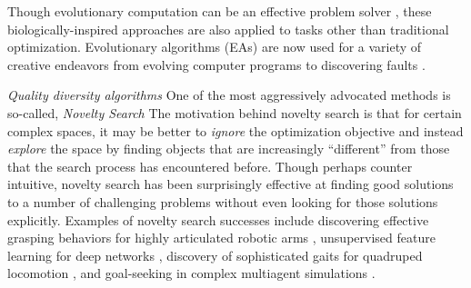 \documentclass[twoside]{article}
\begin{document}
Though evolutionary computation can be an effective problem solver \citep{ec:DeJong2006}, 
these biologically-inspired approaches are also applied to tasks other than traditional optimization.  Evolutionary algorithms (EAs) are now used for a variety of creative endeavors from evolving computer programs \citep{ec:LangdonPoli2002,ec:Koza1992} 
 to discovering faults \citep{HanesWiegand2019tor,Mourad2000srds}.%

\emph{Quality diversity algorithms}  One of the most aggressively advocated methods is so-called, \emph{Novelty Search} \citep{StanleyLehman2015,Lehman2013gecco,LehmanStanley2011cec,LehmanStanley2008ssls}  The motivation behind novelty search is that for certain complex spaces, it may be better to \emph{ignore} the optimization objective and instead \emph{explore} the space by finding objects that are increasingly ``different'' from those that the search process has encountered before.  Though perhaps counter intuitive, novelty search has been surprisingly effective at finding good solutions to a number of challenging problems without even looking for those solutions explicitly.  Examples of novelty search successes include discovering effective grasping behaviors for highly articulated robotic arms \citep{Huang2014cica}, unsupervised feature learning for deep networks \citep{Szerlip2015cai}, discovery of sophisticated gaits for quadruped locomotion \citep{Morse2013acgec}, and goal-seeking in complex multiagent simulations \citep{Lehman2011ecj}.
\end{document}
